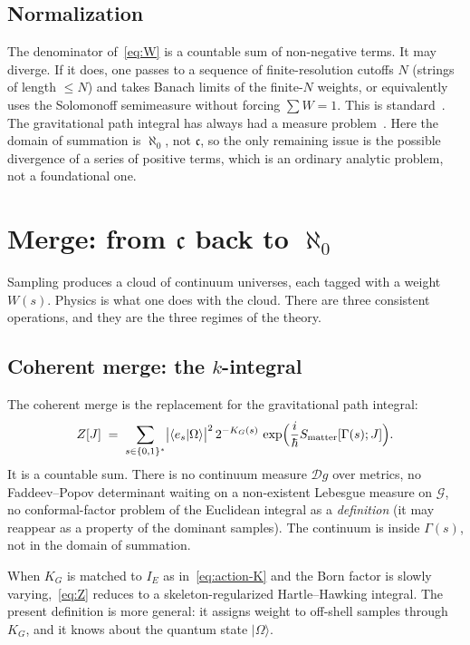 \documentclass[11pt,a4paper]{article}
\theoremstyle{plain}
\theoremstyle{definition}
\theoremstyle{remark}
\newcommand{\alef}{\aleph_{0}}
\newcommand{\cont}{\mathfrak{c}}
\newcommand{\Geo}{\mathcal{G}}
\newcommand{\KG}{K_{G}}
\newcommand{\ket}[1]{\lvert#1\rangle}
\newcommand{\braket}[2]{\langle#1|#2\rangle}
\begin{document}
\subsection{Normalization}

The denominator of~\eqref{eq:W} is a countable sum of non-negative terms.
It may diverge.
If it does, one passes to a sequence of finite-resolution cutoffs $N$ (strings of length $\le N$) and takes Banach limits of the finite-$N$ weights, or equivalently uses the Solomonoff semimeasure without forcing $\sum W=1$.
This is standard~\cite{li2008}.
The gravitational path integral has always had a measure problem~\cite{gibbons1979}.
Here the domain of summation is $\alef$, not $\cont$, so the only remaining issue is the possible divergence of a series of positive terms, which is an ordinary analytic problem, not a foundational one.

\section{\texorpdfstring{Merge: from $\cont$ back to $\alef$}{Merge: from the continuum back to aleph\_0}}
\label{sec:merge}

Sampling produces a cloud of continuum universes, each tagged with a weight $W(s)$.
Physics is what one does with the cloud.
There are three consistent operations, and they are the three regimes of the theory.

\subsection{Coherent merge: the $k$-integral}

The coherent merge is the replacement for the gravitational path integral:
\begin{equation}
  Z[J] \;=\; \sum_{s\in\{0,1\}^{*}} \bigl|\braket{e_{s}}{\Omega}\bigr|^{2}\, 2^{-\KG(s)}\, \exp\Bigl(\frac{i}{\hbar}S_{\mathrm{matter}}[\Gamma(s);J]\Bigr).
  \label{eq:Z}
\end{equation}
It is a countable sum.
There is no continuum measure $\mathcal{D}g$ over metrics, no Faddeev--Popov determinant waiting on a non-existent Lebesgue measure on $\Geo$, no conformal-factor problem of the Euclidean integral as a \emph{definition} (it may reappear as a property of the dominant samples).
The continuum is inside $\Gamma(s)$, not in the domain of summation.

When $\KG$ is matched to $I_{E}$ as in~\eqref{eq:action-K} and the Born factor is slowly varying,~\eqref{eq:Z} reduces to a skeleton-regularized Hartle--Hawking integral.
The present definition is more general: it assigns weight to off-shell samples through $\KG$, and it knows about the quantum state $\ket{\Omega}$.
\end{document}
